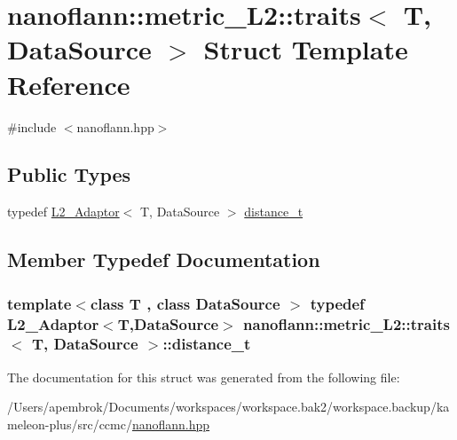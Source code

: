 \hypertarget{structnanoflann_1_1metric___l2_1_1traits}{\section{nanoflann\-:\-:metric\-\_\-\-L2\-:\-:traits$<$ T, Data\-Source $>$ Struct Template Reference}
\label{structnanoflann_1_1metric___l2_1_1traits}
}


{\ttfamily \#include $<$nanoflann.\-hpp$>$}

\subsection*{Public Types}
\begin{DoxyCompactItemize}
\item 
typedef \hyperlink{structnanoflann_1_1_l2___adaptor}{L2\-\_\-\-Adaptor}$<$ T, Data\-Source $>$ \hyperlink{structnanoflann_1_1metric___l2_1_1traits_a80415c5d579219cbf6c3ec33e5f35e79}{distance\-\_\-t}
\end{DoxyCompactItemize}


\subsection{Member Typedef Documentation}
\hypertarget{structnanoflann_1_1metric___l2_1_1traits_a80415c5d579219cbf6c3ec33e5f35e79}{
\subsubsection[{distance\-\_\-t}]{\setlength{\rightskip}{0pt plus 5cm}template$<$class T , class Data\-Source $>$ typedef {\bf L2\-\_\-\-Adaptor}$<$T,Data\-Source$>$ {\bf nanoflann\-::metric\-\_\-\-L2\-::traits}$<$ T, Data\-Source $>$\-::{\bf distance\-\_\-t}}}\label{structnanoflann_1_1metric___l2_1_1traits_a80415c5d579219cbf6c3ec33e5f35e79}


The documentation for this struct was generated from the following file\-:\begin{DoxyCompactItemize}
\item 
/\-Users/apembrok/\-Documents/workspaces/workspace.\-bak2/workspace.\-backup/kameleon-\/plus/src/ccmc/\hyperlink{nanoflann_8hpp}{nanoflann.\-hpp}\end{DoxyCompactItemize}

